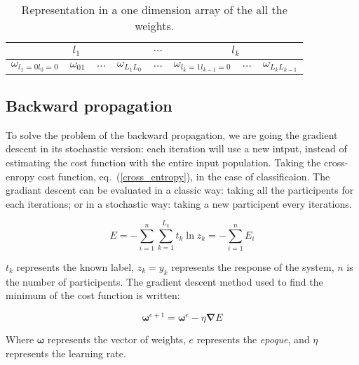 \documentclass[final, paper=letter,5p,times,twocolumn]{elsarticle}
\begin{document}
\begin{table}[]
\centering
\caption{Representation in a one dimension array of the all the weights.}
\label{weights_in_mem}
\begin{tabular}{|c|c|c|c|c|c|c|c|}
\hline
\multicolumn{4}{|c|}{$l_{1}$} & $\hdots$ & \multicolumn{3}{c|}{$l_{k}$} \\ \hline
$\omega_{l_{1}=0l_{0}=0}$   &   $\omega_{01}$   & $\hdots$  &  $\omega_{L_{1}L_{0}}$   & $\hdots$ &    $\omega_{l_{k}=1l_{k-1}=0}$    & $\hdots$  &   $\omega_{L_{k}L_{k-1}}$ \\ \hline
\end{tabular}
\end{table}

\subsection{Backward propagation}

To solve the problem of the backward propagation, we are going the gradient descent in its stochastic version: each iteration will use a new intput, instead of estimating the cost function with the entire input population.
Taking the cross-enropy cost function, eq.~(\ref{cross_entropy}), in the case of classificaion. The gradiant descent can be evaluated in a classic way: taking all the participents for each iterations; or in a stochastic way: taking a new participent every iterations. 

\begin{equation}
  E = - \sum_{i = 1}^{n}\sum_{k = 1}^{L_{k}} t_{k} \ln z_{k} =  - \sum_{i = 1}^{n} E_{i}
  \label{cross_entropy}
\end{equation}

$t_{k}$ represents the known label, $z_{k} = y_{k}$ represents the response of the system, $n$ is the number of participents. The gradient descent method used to find the minimum of the cost function is written:

\begin{equation}
  \bm{\omega}^{e+1} = \bm{\omega}^{e} - \eta \bm{\nabla} E
  \label{gradient_descent}
\end{equation}

Where $\bm{\omega}$ represents the vector of weights, $e$ represents the {\it epoque}, and $\eta$ represents the learning rate. 
\end{document}
